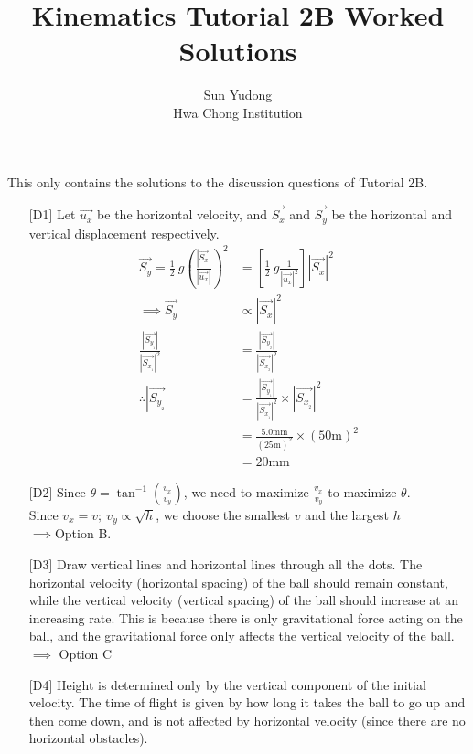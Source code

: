 \documentclass[11pt]{article}
\title{Kinematics Tutorial 2B Worked Solutions}
\author{Sun Yudong\\Hwa Chong Institution}
\begin{document}
	\maketitle
	This only contains the solutions to the discussion questions of Tutorial 2B.
	\begin{enumerate}
		\item[{[D1]}] Let $\vec{u_x}$ be the horizontal velocity, and $\vec{S_x}$ and $\vec{S_y}$ be the horizontal and vertical displacement respectively.
			\begin{align*}
				\vec{S_y} = \frac{1}{2}~g\left(\frac{|\vec{S_x}|}{|\vec{u_x}|}\right)^2&=\left[\frac{1}{2}~g\frac{1}{|\vec{u_x}|^2}\right] |\vec{S_x}|^2 \\
				\implies \vec{S_y} &\propto |\vec{S_x}|^2 \\
				\frac{|\vec{S_{y_{_1}}}|}{|\vec{S_{x_{_1}}}|^2} &= \frac{|\vec{S_{y_{_2}}}|}{|\vec{S_{x_{_2}}}|^2} \\
				\therefore |\vec{S_{y_{_2}}}| &= \frac{|\vec{S_{y_{_1}}}|}{|\vec{S_{x_{_1}}}|^2} \times |\vec{S_{x_{_2}}}|^2 \\
				&= \frac{5.0 \text{mm}}{(25 \text{m})^2} \times (50 \text{m})^2 \\
				&= 20 \text{mm}
			\end{align*}
			
		\vfill
		\item[{[D2]}] Since $\displaystyle \theta = \tan^{-1}\left(\frac{v_x}{v_y}\right)$, we need to maximize $\displaystyle \frac{v_x}{v_y}$ to maximize $\theta$. \\ Since $v_x = v;~ v_y \propto \sqrt{h}$, we choose the smallest $v$ and the largest $h$ \\ $\implies$Option B.
		
		\vfill
		
		\item[{[D3]}] Draw vertical lines and horizontal lines through all the dots. The horizontal velocity (horizontal spacing) of the ball should remain constant, while the vertical velocity (vertical spacing) of the ball should increase at an increasing rate. This is because there is only gravitational force acting on the ball, and the gravitational force only affects the vertical velocity of the ball. \\ $\implies$ Option C
		
		\vfill
		
		\pagebreak
		
		\item[{[D4]}]
			Height is determined only by the vertical component of the initial velocity. The time of flight is given by how long it takes the ball to go up and then come down, and is not affected by horizontal velocity (since there are no horizontal obstacles).
			

\end{enumerate}
\end{document}
